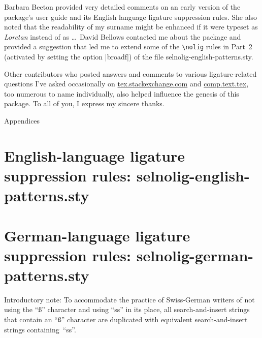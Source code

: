 \documentclass[11pt]{article}
\newcommand{\pkg}[1]{\textsf{#1}}
\newcommand{\cmmd}[1]{\texttt{\textbackslash #1}}
\let\oldappendix\appendix
\renewcommand\appendix{%
   \addtocontents{toc}{\protect{\vspace{1\baselineskip}}}
   \addtocontents{toc}{\protect{\mdseries Appendices\par}}
   \noindent
   {\Large Appendices}
   \oldappendix}
\begin{document}
Barbara Beeton provided very detailed comments on an early version of the package's user guide and its English language ligature suppression rules. She also noted that the readability of my surname might be enhanced if it were typeset as \emph{Loretan} instead of as \emph{}\dots\ David Bellows contacted me about the package and provided a suggestion that led me to extend some of the \cmmd{nolig} rules in Part~2 (activated by setting the option |broadf|) of the file \pkg{selnolig-english-patterns.sty}.

Other contributors who posted answers and comments to various ligature-related questions I've asked occasionally on \href{http://tex.stackexchange.com/}{tex.stackexchange.com} and \href{https://groups.google.com/forum/#!forum/comp.text.tex}{comp.text.tex}, too numerous to name individually, also helped influence the genesis of this package. To all of you, I express my sincere thanks.



\clearpage
\appendix
\selnoligoff  %


\small %


\section[The package's English-language ligature suppression rules]{English-language ligature suppression rules: 
\pkg{selnolig-english-patterns.sty}}
\label{sec:eng-listing}

\begin{multicols}{2}
\end{multicols}

\clearpage
\section[The package's German-language ligature suppression rules]{German-language ligature suppression rules: \pkg{selnolig-german-patterns.sty}}
\label{sec:germ-listing}

Introductory note: To accommodate the practice of Swiss-German writers of not using the \enquote{ß} character and using \enquote{ss} in its place, all search-and-insert strings that contain an \enquote{ß} character are duplicated with equivalent search-and-insert strings containing~\enquote{ss}.
\end{document}
